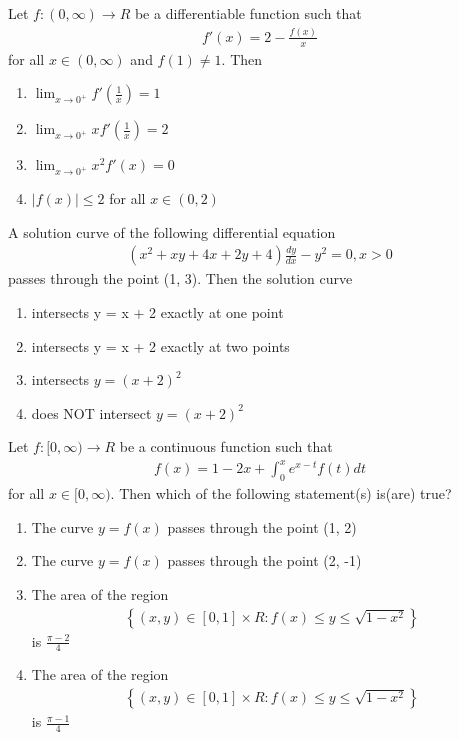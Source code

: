 \item Let $f: (0, \infty) \to R$ be a differentiable function such that
\begin{align*}
f'(x) = 2 - \frac{f(x)}{x}
\end{align*}
for all $x \in (0, \infty)$ and $f(1) \neq 1$. Then 
\begin{enumerate}
\item $\lim_{x \to 0^{+}}f'\left(\frac{1}{x}\right) = 1$
\item $\lim_{x \to 0^{+}}xf'\left(\frac{1}{x}\right) = 2$
\item $\lim_{x \to 0^{+}}x^2f'(x) = 0$
\item $|f(x)| \leq 2$ for all $x \in (0, 2)$
\end{enumerate}

\item A solution curve of the following differential equation
\begin{align*}
(x^2 + xy + 4x + 2y + 4)\frac{dy}{dx} - y^2 = 0, x > 0
\end{align*}
passes through the point (1, 3). Then the solution curve
\begin{enumerate}
\item intersects y = x + 2 exactly at one point
\item intersects y = x + 2 exactly at two points
\item intersects $y = (x + 2)^2$
\item does NOT intersect $y = (x + 2)^2$
\end{enumerate}

\item Let $f: [0, \infty) \to R$ be a continuous function such that
\begin{align*}
f(x) = 1 - 2x + \int_{0}^{x}e^{x - t}f(t)dt
\end{align*}
for all $x \in [0, \infty)$. Then which of the following statement(s) is(are) true?
\begin{enumerate}
\item The curve $y = f(x)$ passes through the point (1, 2)
\item The curve $y = f(x)$ passes through the point (2, -1)
\item The area of the region
\begin{align*}
\left\lbrace(x, y) \in [0, 1] \times R: f(x) \leq y \leq \sqrt{1 - x^2}\right\rbrace
\end{align*}
is $\frac{\pi - 2}{4}$
\item The area of the region
\begin{align*}
\left\lbrace(x, y) \in [0, 1] \times R: f(x) \leq y \leq \sqrt{1 - x^2}\right\rbrace
\end{align*}
is $\frac{\pi - 1}{4}$
\end{enumerate}

